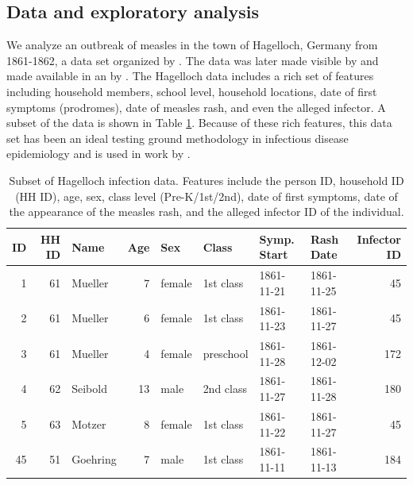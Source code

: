 \documentclass[
  shortnames]{jss}
\begin{document}
\subsection{Data and exploratory analysis}

We analyze an outbreak of measles in the town of Hagelloch, Germany from
1861-1862, a data set organized by \cite{pfeilsticker1863}. The data was
later made visible by \cite{oesterle1992} and made available in an
 by \cite{surveillance2017}. The Hagelloch data includes a
rich set of features including household members, school level,
household locations, date of first symptoms (prodromes), date of measles
rash, and even the alleged infector. A subset of the data is shown in
Table \ref{tab:hags-people}. Because of these rich features, this data
set has been an ideal testing ground methodology in infectious disease
epidemiology and is used in work by
\cite{Neal2004,britton2011,groendyke2012,becker2016}.

\begin{CodeChunk}
\begin{table}[!h]

\caption{\label{tab:hags-people}Subset of Hagelloch infection data.  Features include the person ID, household ID (HH ID), age, sex, class level (Pre-K/1st/2nd), date of first symptoms, date of the appearance of the measles rash, and the alleged infector ID of the individual.}
\centering
\begin{tabular}[t]{rrlrllllr}
\toprule
ID & HH ID & Name & Age & Sex & Class & Symp. Start & Rash Date & Infector ID\\
\midrule
1 & 61 & Mueller & 7 & female & 1st class & 1861-11-21 & 1861-11-25 & 45\\
2 & 61 & Mueller & 6 & female & 1st class & 1861-11-23 & 1861-11-27 & 45\\
3 & 61 & Mueller & 4 & female & preschool & 1861-11-28 & 1861-12-02 & 172\\
4 & 62 & Seibold & 13 & male & 2nd class & 1861-11-27 & 1861-11-28 & 180\\
5 & 63 & Motzer & 8 & female & 1st class & 1861-11-22 & 1861-11-27 & 45\\
45 & 51 & Goehring & 7 & male & 1st class & 1861-11-11 & 1861-11-13 & 184\\
\bottomrule
\end{tabular}
\end{table}

\end{CodeChunk}
\end{document}
